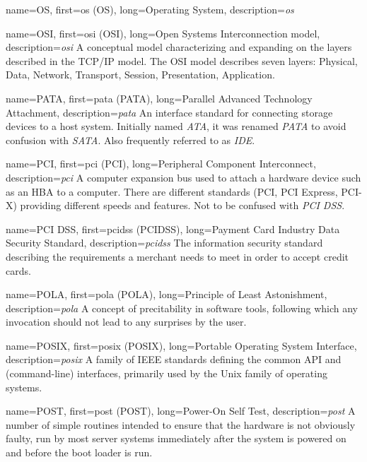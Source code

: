 {
	name={OS},
	first={\acrlong{os} (OS)},
	long={Operating System},
	description={{\em \acrlong{os}} \empty}
}

{
	name={OSI},
	first={\acrlong{osi} (OSI)},
	long={Open Systems Interconnection model},
	description={{\em \acrlong{osi}} A conceptual
model characterizing and expanding on the layers
described in the TCP/IP model.  The OSI model
describes seven layers: Physical, Data, Network,
Transport, Session, Presentation, Application.}
}

{
	name={PATA},
	first={\acrlong{pata} (PATA)},
	long={Parallel Advanced Technology Attachment},
	description={{\em \acrlong{pata}} An interface
standard for connecting storage devices to a host system.  Initially named
{\em ATA}, it was renamed {\em PATA} to avoid confusion with {\em SATA}.
Also frequently referred to as {\em IDE}.}
}

{
	name={PCI},
	first={\acrlong{pci} (PCI)},
	long={Peripheral Component Interconnect},
	description={{\em \acrlong{pci}} A computer expansion bus
used to attach a hardware device such as an HBA to a computer.  There are
different standards (PCI, PCI Express, PCI-X) providing different speeds
and features. Not to be confused with {\em PCI DSS}.}
}

{
	name={PCI DSS},
	first={\acrlong{pcidss} (PCIDSS)},
	long={Payment Card Industry Data Security Standard},
	description={{\em \acrlong{pcidss}} The
information security standard describing the requirements a merchant needs
to meet in order to accept credit cards.}
}

{
	name={POLA},
	first={\acrlong{pola} (POLA)},
	long={Principle of Least Astonishment},
	description={{\em \acrlong{pola}} A concept of
precitability in software tools, following which any invocation should not
lead to any surprises by the user.}
}

{
	name={POSIX},
	first={\acrlong{posix} (POSIX)},
	long={Portable Operating System Interface},
	description={{\em \acrlong{posix}} A family of IEEE
standards defining the common API and (command-line) interfaces, primarily
used by the Unix family of operating systems.}
}

{
	name={POST},
	first={\acrlong{post} (POST)},
	long={Power-On Self Test},
	description={{\em \acrlong{post}} A number of simple routines intended
to ensure that the hardware is not obviously faulty, run by most server
systems immediately after the system is powered on and before the boot
loader is run.}
}

